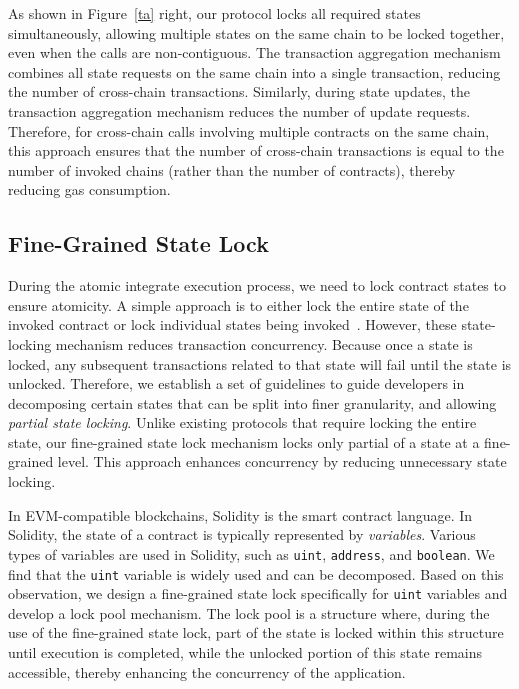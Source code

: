 As shown in Figure~\ref{ta} right, our protocol locks all required states simultaneously, allowing multiple states on the same chain to be locked together, even when the calls are non-contiguous. 
The transaction aggregation mechanism combines all state requests on the same chain into a single transaction, reducing the number of cross-chain transactions. 
Similarly, during state updates, the transaction aggregation mechanism reduces the number of update requests. 
Therefore, for cross-chain calls involving multiple contracts on the same chain, this approach ensures that the number of cross-chain transactions is equal to the number of invoked chains (rather than the number of contracts), thereby reducing gas consumption.

\subsection{Fine-Grained State Lock}
\label{subsec:lock}

During the atomic integrate execution process, we need to lock contract states to ensure atomicity. 
A simple approach is to either lock the entire state of the invoked contract or lock individual states being invoked~\cite{chen2024atomci, robinson2021general}. 
However, these state-locking mechanism reduces transaction concurrency.
Because once a state is locked, any subsequent transactions related to that state will fail until the state is unlocked. 
Therefore, we establish a set of guidelines to guide developers in decomposing certain states that can be split into finer granularity, and allowing \emph{partial state locking}. 
Unlike existing protocols that require locking the entire state, our fine-grained state lock mechanism locks only partial of a state at a fine-grained level. This approach enhances concurrency by reducing unnecessary state locking.

In EVM-compatible blockchains, Solidity is the smart contract language. 
In Solidity, the state of a contract is typically represented by \emph{variables}. 
Various types of variables are used in Solidity, such as \texttt{uint}, \texttt{address}, and \texttt{boolean}. 
We find that the \texttt{uint} variable is widely used and can be decomposed.
Based on this observation, we design a fine-grained state lock specifically for \texttt{uint} variables and develop a lock pool mechanism. 
The lock pool is a structure where, during the use of the fine-grained state lock, part of the state is locked within this structure until execution is completed, while the unlocked portion of this state remains accessible, thereby enhancing the concurrency of the application. 

